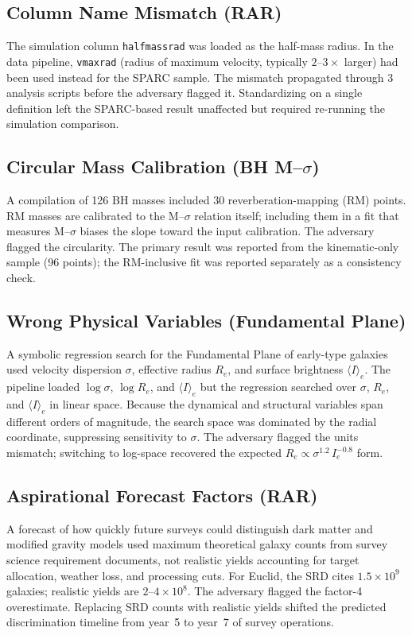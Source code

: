 \documentclass[twocolumn]{aastex631}
\begin{document}
\subsection{Column Name Mismatch (RAR)}
The simulation column \texttt{halfmassrad} was loaded as the
half-mass radius.  In the data pipeline, \texttt{vmaxrad} (radius of
maximum velocity, typically $2$--$3\times$ larger) had been used
instead for the SPARC sample.  The mismatch propagated through 3
analysis scripts before the adversary flagged it.  Standardizing on a
single definition left the SPARC-based result unaffected but required
re-running the simulation comparison.

\subsection{Circular Mass Calibration (BH M--$\sigma$)}
A compilation of 126 BH masses included 30 reverberation-mapping
(RM) points.  RM masses are calibrated to the M--$\sigma$ relation
itself; including them in a fit that measures M--$\sigma$ biases the
slope toward the input calibration.  The adversary flagged the
circularity.  The primary result was reported from the kinematic-only
sample (96 points); the RM-inclusive fit was reported separately as a
consistency check.

\subsection{Wrong Physical Variables (Fundamental Plane)}
A symbolic regression search for the Fundamental Plane of early-type
galaxies used velocity dispersion $\sigma$, effective radius $R_e$,
and surface brightness $\langle I\rangle_e$.  The pipeline loaded
$\log\sigma$, $\log R_e$, and $\langle I\rangle_e$ but the regression
searched over $\sigma$, $R_e$, and $\langle I\rangle_e$ in linear space.
Because the dynamical and structural variables span different orders of
magnitude, the search space was dominated by the radial coordinate,
suppressing sensitivity to $\sigma$.  The adversary flagged the units
mismatch; switching to log-space recovered the expected
$R_e\propto\sigma^{1.2}\,I_e^{-0.8}$ form.

\subsection{Aspirational Forecast Factors (RAR)}
A forecast of how quickly future surveys could distinguish dark matter
and modified gravity models used maximum theoretical galaxy counts
from survey science requirement documents, not realistic yields
accounting for target allocation, weather loss, and processing cuts.
For Euclid, the SRD cites $1.5\times10^9$ galaxies; realistic yields
are $2$--$4\times10^8$.  The adversary flagged the factor-4 overestimate.
Replacing SRD counts with realistic yields shifted the predicted
discrimination timeline from year~5 to year~7 of survey operations.
\end{document}
